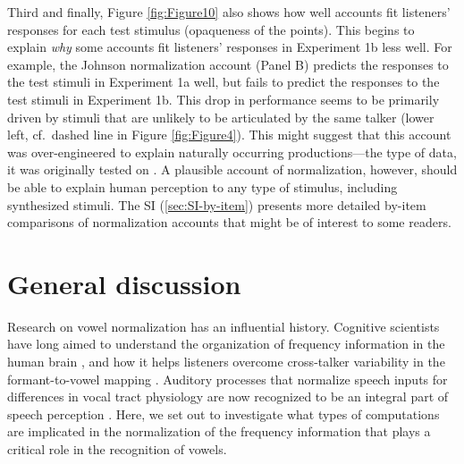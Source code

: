 \documentclass[preprint]{JASA}
\begin{document}
Third and finally, Figure \ref{fig:Figure10} also shows how well accounts fit listeners' responses for each test stimulus (opaqueness of the points). This begins to explain \emph{why} some accounts fit listeners' responses in Experiment 1b less well. For example, the Johnson normalization account (Panel B) predicts the responses to the test stimuli in Experiment 1a well, but fails to predict the responses to the test stimuli in Experiment 1b. This drop in performance seems to be primarily driven by stimuli that are unlikely to be articulated by the same talker (lower left, cf.~dashed line in Figure \ref{fig:Figure4}). This might suggest that this account was over-engineered to explain naturally occurring productions---the type of data, it was originally tested on \citep{johnson2020}. A plausible account of normalization, however, should be able to explain human perception to any type of stimulus, including synthesized stimuli. The SI (\ref{sec:SI-by-item}) presents more detailed by-item comparisons of normalization accounts that might be of interest to some readers.

\section{General discussion}\label{sec:G-D}

Research on vowel normalization has an influential history. Cognitive scientists have long aimed to understand the organization of frequency information in the human brain \citep{stevens-volkmann1940, siegel1965}, and how it helps listeners overcome cross-talker variability in the formant-to-vowel mapping \citep[e.g.,][]{joos1948, fant1975, nordstrom-lindblom1975}. Auditory processes that normalize speech inputs for differences in vocal tract physiology are now recognized to be an integral part of speech perception \citep{mcmurray-jongman2011, johnson-sjerps2021, xie2023}. Here, we set out to investigate what types of computations are implicated in the normalization of the frequency information that plays a critical role in the recognition of vowels.
\end{document}
